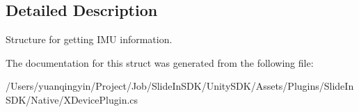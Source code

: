 \subsection{Detailed Description}
Structure for getting I\+MU information. 

The documentation for this struct was generated from the following file\+:\begin{DoxyCompactItemize}
\item 
/\+Users/yuanqingyin/\+Project/\+Job/\+Slide\+In\+S\+D\+K/\+Unity\+S\+D\+K/\+Assets/\+Plugins/\+Slide\+In\+S\+D\+K/\+Native/X\+Device\+Plugin.\+cs\end{DoxyCompactItemize}
